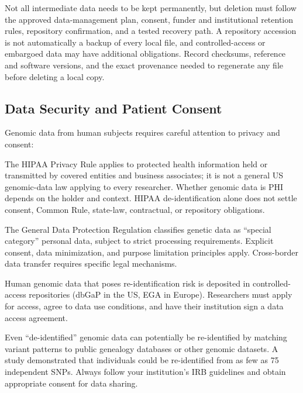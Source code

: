 \begin{tipbox}[title={Data Retention Strategy}]
Not all intermediate data needs to be kept permanently, but deletion must follow the approved data-management plan, consent, funder and institutional retention rules, repository confirmation, and a tested recovery path. A repository accession is not automatically a backup of every local file, and controlled-access or embargoed data may have additional obligations. Record checksums, reference and software versions, and the exact provenance needed to regenerate any file before deleting a local copy.
\end{tipbox}

\subsection{Data Security and Patient Consent}

Genomic data from human subjects requires careful attention to privacy and consent:

\begin{description}[style=nextline, font=\bfseries, itemsep=3pt]
  \item[HIPAA (USA)]
  The HIPAA Privacy Rule applies to protected health information held or transmitted by covered entities and business associates; it is not a general US genomic-data law applying to every researcher. Whether genomic data is PHI depends on the holder and context. HIPAA de-identification alone does not settle consent, Common Rule, state-law, contractual, or repository obligations.

  \item[GDPR (EU)]
  The General Data Protection Regulation classifies genetic data as ``special category'' personal data, subject to strict processing requirements. Explicit consent, data minimization, and purpose limitation principles apply. Cross-border data transfer requires specific legal mechanisms.

  \item[Controlled-access repositories]
  Human genomic data that poses re-identification risk is deposited in controlled-access repositories (dbGaP in the US, EGA in Europe). Researchers must apply for access, agree to data use conditions, and have their institution sign a data access agreement.
\end{description}

\begin{warningbox}[title={Genomic Data Is Inherently Identifiable}]
Even ``de-identified'' genomic data can potentially be re-identified by matching variant patterns to public genealogy databases or other genomic datasets. A study demonstrated that individuals could be re-identified from as few as 75 independent SNPs. Always follow your institution's IRB guidelines and obtain appropriate consent for data sharing.
\end{warningbox}

